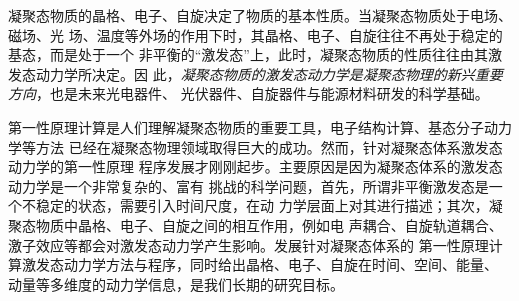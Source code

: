 


凝聚态物质的晶格、电子、自旋决定了物质的基本性质。当凝聚态物质处于电场、磁场、光
场、温度等外场的作用下时，其晶格、电子、自旋往往不再处于稳定的基态，而是处于一个
非平衡的“激发态”上，此时，凝聚态物质的性质往往由其激发态动力学所决定。因
此，\emph{凝聚态物质的激发态动力学是凝聚态物理的新兴重要方向}，也是未来光电器件、
光伏器件、自旋器件与能源材料研发的科学基础。

第一性原理计算是人们理解凝聚态物质的重要工具，电子结构计算、基态分子动力学等方法
已经在凝聚态物理领域取得巨大的成功。然而，针对凝聚态体系激发态动力学的第一性原理
程序发展才刚刚起步。主要原因是因为凝聚态体系的激发态动力学是一个非常复杂的、富有
挑战的科学问题，首先，所谓非平衡激发态是一个不稳定的状态，需要引入时间尺度，在动
力学层面上对其进行描述；其次，凝聚态物质中晶格、电子、自旋之间的相互作用，例如电
声耦合、自旋轨道耦合、激子效应等都会对激发态动力学产生影响。发展针对凝聚态体系的
第一性原理计算激发态动力学方法与程序，同时给出晶格、电子、自旋在时间、空间、能量、
动量等多维度的动力学信息，是我们长期的研究目标。

